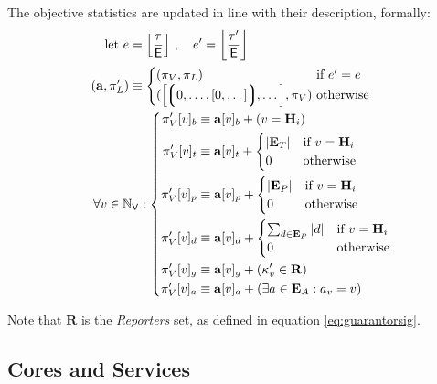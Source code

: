The objective statistics are updated in line with their description, formally:
\begin{align}
    \using e =\; &\ffrac{\tau}{\mathsf{E}} \ ,\quad e' = \ffrac{\tau'}{\mathsf{E}}\\
    \!(\mathbf{a}, \pi'_L) \equiv\;&\begin{cases}
        (\pi_V, \pi_L) &\when e' = e \\
        (\sq{\tuple{0, \dots, [0, \dots]}, \dots}, \pi_V)\!\!\!\! &\otherwise
    \end{cases}\!\!\!\!\\
    \forall v \in \N_\mathsf{V} :&\; \left\{\begin{aligned}
        \pi'_V[v]_b &\equiv \mathbf{a}[v]_b + (v = \mathbf{H}_i)\\
        \pi'_V[v]_t &\equiv \mathbf{a}[v]_t + \begin{cases}
            |\xttickets| &\when v = \mathbf{H}_i \\
            0 &\otherwise
        \end{cases}\\
        \pi'_V[v]_p &\equiv \mathbf{a}[v]_p + \begin{cases}
            |\xtpreimages| &\when v = \mathbf{H}_i \\
            0 &\otherwise
        \end{cases}\\
        \pi'_V[v]_d &\equiv \mathbf{a}[v]_d + \begin{cases}
            \sum_{d \in \xtpreimages}|d| &\when v = \mathbf{H}_i \\
            0 &\otherwise
        \end{cases}\\
        \pi'_V[v]_g &\equiv \mathbf{a}[v]_g + (\kappa'_v \in \mathbf{R})\\
        \pi'_V[v]_a &\equiv \mathbf{a}[v]_a + (\exists a \in \xtassurances : a_v = v)
    \end{aligned}\right.\!\!\!\!\!
\end{align}

Note that $\mathbf{R}$ is the \emph{Reporters} set, as defined in equation \ref{eq:guarantorsig}.

\subsection{Cores and Services}


